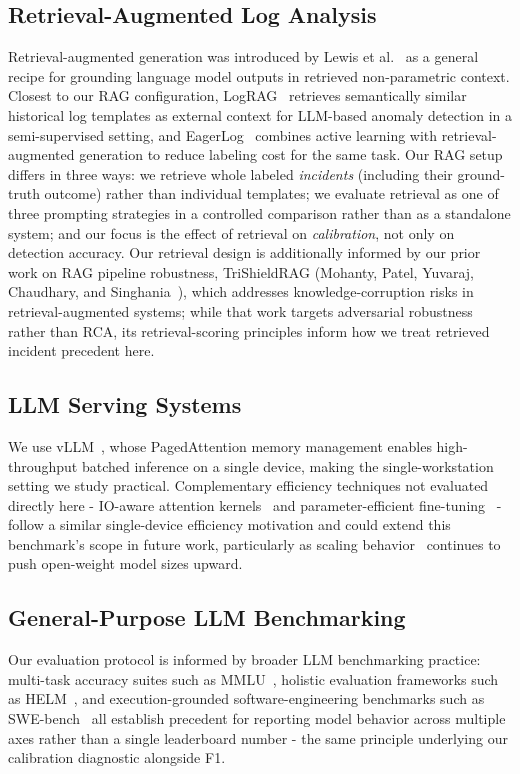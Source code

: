 \documentclass[10pt,conference]{IEEEtran}
\begin{document}
\subsection{Retrieval-Augmented Log Analysis}
Retrieval-augmented generation was introduced by Lewis et
al.~\cite{lewis2020rag} as a general recipe for grounding language model
outputs in retrieved non-parametric context. Closest to our RAG
configuration, LogRAG~\cite{lograg2024} retrieves
semantically similar historical log templates as external context for
LLM-based anomaly detection in a semi-supervised setting, and
EagerLog~\cite{duan2025eagerlog} combines active learning with
retrieval-augmented generation to reduce labeling cost for the same task.
Our RAG setup
differs in three ways: we retrieve whole labeled \emph{incidents}
(including their ground-truth outcome) rather than individual templates;
we evaluate retrieval as one of three prompting strategies in a
controlled comparison rather than as a standalone system; and our focus
is the effect of retrieval on \emph{calibration}, not only on detection
accuracy. Our retrieval design is additionally informed by our prior work
on RAG pipeline robustness, TriShieldRAG (Mohanty, Patel, Yuvaraj,
Chaudhary, and Singhania~\cite{rohitpatel2026trishieldrag}), which
addresses knowledge-corruption risks in retrieval-augmented
systems; while that work targets adversarial robustness rather than RCA,
its retrieval-scoring principles inform how we treat retrieved incident
precedent here.

\subsection{LLM Serving Systems}
We use vLLM~\cite{vllm2023}, whose PagedAttention memory management
enables high-throughput batched inference on a single device, making the
single-workstation setting we study practical. Complementary
efficiency techniques not evaluated directly here - IO-aware attention
kernels~\cite{dao2022flashattention} and parameter-efficient
fine-tuning~\cite{hu2022lora} - follow a similar single-device
efficiency motivation and could extend this benchmark's scope in future
work, particularly as scaling behavior~\cite{kaplan2020scaling} continues
to push open-weight model sizes upward.

\subsection{General-Purpose LLM Benchmarking}
Our evaluation protocol is informed by broader LLM benchmarking practice:
multi-task accuracy suites such as MMLU~\cite{hendrycks2021mmlu}, holistic
evaluation frameworks such as HELM~\cite{liang2022helm}, and
execution-grounded software-engineering benchmarks such as
SWE-bench~\cite{jimenez2023swebench} all establish precedent for
reporting model behavior across multiple axes rather than a single
leaderboard number - the same principle underlying our calibration
diagnostic alongside F1.
\end{document}
